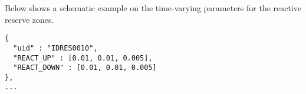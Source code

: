 
Below shows a schematic example on the time-varying parameters for the reactive reserve zones. 
\begin{verbatim}
{
  "uid" : "IDRES0010",
  "REACT_UP" : [0.01, 0.01, 0.005],
  "REACT_DOWN" : [0.01, 0.01, 0.005]
},
...
\end{verbatim}




